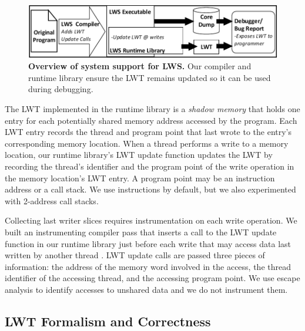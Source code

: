 \documentclass[pageno,nohyperref]{jpaper}
\newcommand{\lws}{LWS\xspace}
\newcommand{\lwt}{LWT\xspace}
\newcommand{\Caption}[1]{\begin{minipage}{.95\columnwidth} \caption{#1} \end{minipage} \vspace{-1.2ex}}
\begin{document}
\begin{figure}[h]
\centering
\includegraphics[width=.9\columnwidth]{figs/LWS_Overview.pdf}
\Caption{\label{fig:lwsoverview}{\bf Overview of system support for \lws.} Our compiler and runtime library ensure the \lwt remains updated so it can be used during debugging.}
\end{figure}

The \lwt implemented in the runtime library is a {\em shadow memory} that holds
one entry for each potentially shared memory address accessed by the program.
Each \lwt entry records the thread and program point that last wrote to the
entry's corresponding memory location.  When a thread performs a write to a
memory location, our runtime library's \lwt update function updates the \lwt by
recording the thread's identifier and the program point of the write operation
in the memory location's \lwt entry.  A program point may be an instruction
address or a call stack.  We use instructions by default, but we also experimented
with 2-address call stacks.   

Collecting last writer slices requires instrumentation on each write operation.
We built an instrumenting compiler pass that inserts a call to the \lwt update
function in our runtime library just before each write that may access data
last written by another thread .  \lwt update calls are passed three pieces of
information: the address of the memory word involved in the access, the thread
identifier of the accessing thread, and the accessing program point.   We use
escape analysis to identify accesses to unshared data and we do not instrument
them.  



\subsection{\lwt Formalism and Correctness}
\label{sec:lwssoundness}
\end{document}
